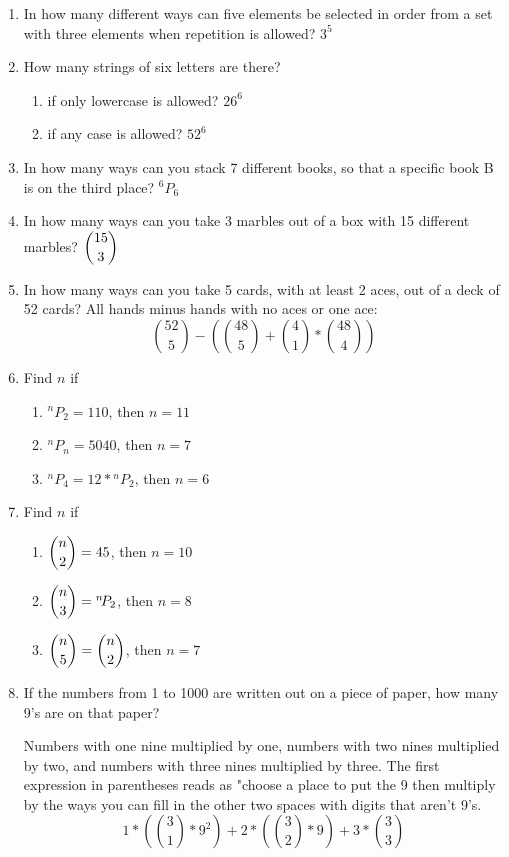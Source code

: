 \documentclass{article}
\newcommand*{\Perm}[2]{{}^{#1}\!P_{#2}}%
\begin{document}
\begin{enumerate}
\item In how many different ways can five elements be selected in order from a set with three elements when repetition is allowed? $3^5$

\item How many strings of six letters are there?
  \begin{enumerate}
  \item if only lowercase is allowed? $26^6$
  \item if any case is allowed? $52^6$
  \end{enumerate}

\item In how many ways can you stack 7 different books, so that a specific book B is on the third place? $ \Perm{6}{6} $

\item In how many ways can you take 3 marbles out of a box with 15 different marbles? $ \dbinom{15}{3} $

\item In how many ways can you take 5 cards, with at least 2 aces, out of a deck of 52 cards? All hands minus hands with no aces or one ace:
\[ \binom{52}{5} - \left( \binom{48}{5} + \binom{4}{1} * \binom{48}{4} \right) \]

\item Find $n$ if
  \begin{enumerate}
  \item $\Perm{n}{2} = 110$, then $n = 11$
  \item $\Perm{n}{n} = 5040$, then $n = 7$
  \item $\Perm{n}{4} = 12 * \Perm{n}{2}$, then $n = 6$
  \end{enumerate}

\item Find $n$ if
  \begin{enumerate}
  \item $ \dbinom{n}{2} = 45 $, then $n = 10$
  \item $ \dbinom{n}{3} = \Perm{n}{2} $, then $n = 8$
  \item $ \dbinom{n}{5} = \dbinom{n}{2} $, then $n = 7$
  \end{enumerate}

\item If the numbers from 1 to 1000 are written out on a piece of paper, how many 9's are on that paper?

Numbers with one nine multiplied by one, numbers with two nines multiplied by two, and numbers with three nines multiplied by three. The first expression in parentheses reads as "choose a place to put the 9 then multiply by the ways you can fill in the other two spaces with digits that aren't 9's.
\[ 1 * \left( \binom{3}{1} * 9^2 \right) + 2 * \left( \binom{3}{2} * 9 \right) + 3 * \binom{3}{3} \]
\end{enumerate}
\end{document}

